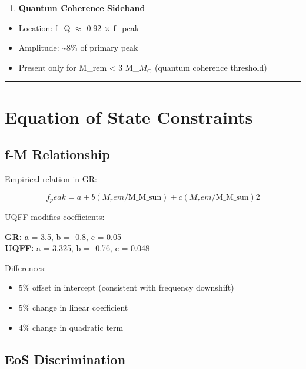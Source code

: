 \documentclass[12pt,a4paper]{article}
\begin{document}
\begin{enumerate}
  \item \textbf{Quantum Coherence Sideband}
\end{enumerate}

\begin{itemize}
  \item Location: f\_Q $\approx$ 0.92 $\times$ f\_peak
  \item Amplitude: \textasciitilde{}8\% of primary peak
  \item Present only for M\_rem < 3 M\_{$M_{\odot}$} (quantum coherence threshold)
\end{itemize}

\medskip\hrule\medskip

\section{Equation of State Constraints}

\subsection{f-M Relationship}

Empirical relation in GR:

\begin{equation}
f_peak = a + b(M_rem/\text{M\_M\_sun}) + c(M_rem/\text{M\_M\_sun})2
\end{equation}

UQFF modifies coefficients:

\begin{flushleft}
\textbf{GR:} a = 3.5, b = -0.8, c = 0.05 \\
\textbf{UQFF:} a = 3.325, b = -0.76, c = 0.048 \\
\end{flushleft}

Differences:

\begin{itemize}
  \item 5\% offset in intercept (consistent with frequency downshift)
  \item 5\% change in linear coefficient
  \item 4\% change in quadratic term
\end{itemize}

\subsection{EoS Discrimination}
\end{document}
